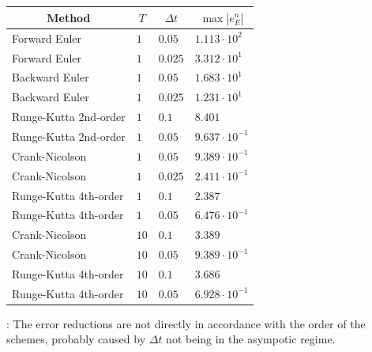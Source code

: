 \documentclass[%
oneside,                 %
final,                   %
10pt]{article}
\newcommand{\longinlinecomment}[3]{{\color{red}{\bf #1}: #2}}
\begin{document}
\begin{center}
\begin{tabular}{llll}
\hline
\multicolumn{1}{c}{ Method } & \multicolumn{1}{c}{ $T$ } & \multicolumn{1}{c}{ $\Delta t$ } & \multicolumn{1}{c}{ $\max \left\vert e_E^n\right\vert$ } \\
\hline
Forward Euler         & $1$  & $0.05$     & $1.113\cdot 10^{2}$                \\
Forward Euler         & $1$  & $0.025$    & $3.312\cdot 10^{1}$                \\
Backward Euler        & $1$  & $0.05$     & $1.683\cdot 10^{1}$                \\
Backward Euler        & $1$  & $0.025$    & $1.231\cdot 10^{1}$                \\
Runge-Kutta 2nd-order & $1$  & $0.1$      & $8.401$                            \\
Runge-Kutta 2nd-order & $1$  & $0.05$     & $9.637\cdot 10^{-1}$               \\
Crank-Nicolson        & $1$  & $0.05$     & $9.389\cdot 10^{-1}$               \\
Crank-Nicolson        & $1$  & $0.025$    & $2.411\cdot 10^{-1}$               \\
Runge-Kutta 4th-order & $1$  & $0.1$      & $2.387$                            \\
Runge-Kutta 4th-order & $1$  & $0.05$     & $6.476\cdot 10^{-1}$               \\
Crank-Nicolson        & $10$ & $0.1$      & $3.389$                            \\
Crank-Nicolson        & $10$ & $0.05$     & $9.389\cdot 10^{-1}$               \\
Runge-Kutta 4th-order & $10$ & $0.1$      & $3.686$                            \\
Runge-Kutta 4th-order & $10$ & $0.05$     & $6.928\cdot 10^{-1}$               \\
\hline
\end{tabular}
\end{center}

\noindent
\longinlinecomment{hpl 6}{ The error reductions are not directly in accordance with the order of the schemes, probably caused by $\Delta t$ not being in the asympotic regime. }{ The error reductions are }


\end{document}
